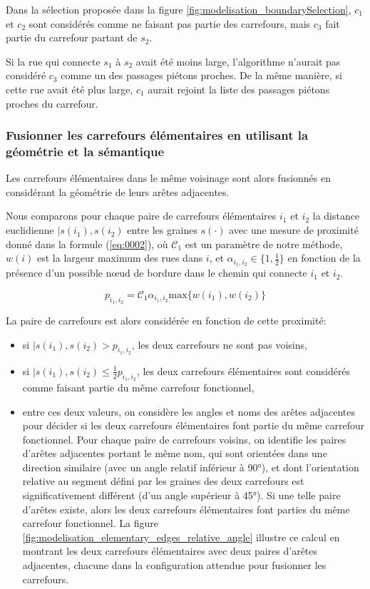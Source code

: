 \newpar{}

Dans la sélection proposée dans la figure \ref{fig:modelisation_boundarySelection}, $c_1$ et $c_2$ sont considérés comme ne faisant pas partie des carrefours, mais $c_3$ fait partie du carrefour partant de $s_2$.

Si la rue qui connecte $s_1$ à $s_2$ avait été moins large, l'algorithme n'aurait pas considéré $c_3$ comme un des passages piétons proches. De la même manière, si cette rue avait été plus large, $c_1$ aurait rejoint la liste des passages piétons proches du carrefour.

\subsubsection{Fusionner les carrefours élémentaires en utilisant la géométrie et la sémantique}

Les carrefours élémentaires dans le même voisinage sont alors fusionnés en considérant la géométrie de leurs arêtes adjacentes.

Nous comparons pour chaque paire de carrefours élémentaires $i_1$ et $i_2$ la distance euclidienne 
$|s(i_1), s(i_2)$ entre les graines $s(\cdot)$ avec une mesure de proximité donné dans la formule (\ref{eq:0002}), où $\mathcal{C}_1$ est un paramètre de notre méthode, $w(i)$ est la largeur maximum des rues dans $i$, et $\alpha_{i_1, i_2} \in \{ 1, \frac{1}{2} \}$ en fonction de la présence d'un possible nœud de bordure dans le chemin qui connecte $i_1$ et $i_2$.

\begin{equation}
 p_{i_1, i_2} = \mathcal{C}_1 \alpha_{i_1, i_2} \mathrm{max} \{ w(i_1), w(i_2) \}
 \label{eq:0002}
\end{equation}

La paire de carrefours est alors considérée en fonction de cette proximité:
\begin{itemize}
    \item si $|s(i_1), s(i_2) > p_{i_1, i_2}$, les deux carrefours ne sont pas voisins,
    \item si $|s(i_1), s(i_2) \leq \frac{1}{2} p_{i_1, i_2}$, les deux carrefours élémentaires sont considérés comme faisant partie du même carrefour fonctionnel,
    \item entre ces deux valeurs, on considère les angles et noms des arêtes adjacentes pour décider si les deux carrefours élémentaires font partie du même carrefour fonctionnel. Pour chaque paire de carrefours voisins, on identifie les paires d'arêtes adjacentes portant le même nom, qui sont orientées dans une direction similaire (avec un angle relatif inférieur à 90°), et dont l'orientation relative au segment défini par les graines des deux carrefours est significativement différent (d'un angle supérieur à 45°). Si une telle paire d'arêtes existe, alors les deux carrefours élémentaires font parties du même carrefour fonctionnel. La figure \ref{fig:modelisation_elementary_edges_relative_angle} illustre ce calcul en montrant les deux carrefours élémentaires avec deux paires d'arêtes adjacentes, chacune dans la configuration attendue pour fusionner les carrefours.
\end{itemize}

